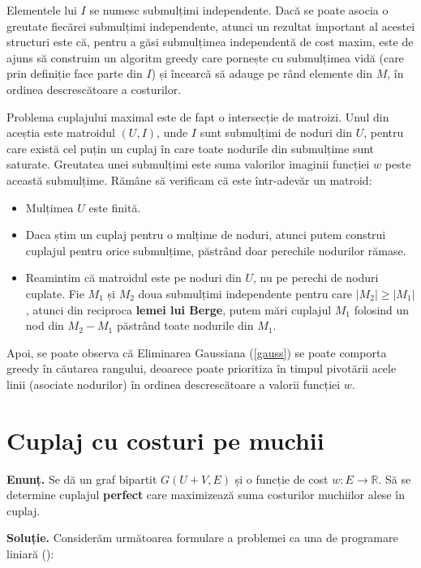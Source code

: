Elementele lui $I$ se numesc submulțimi independente. Dacă se poate asocia o greutate fiecărei submulțimi independente, atunci un rezultat
important al acestei structuri este că, pentru a găsi submulțimea independentă de cost maxim, este de ajuns să construim un algoritm greedy
care pornește cu submulțimea vidă (care prin definiție face parte din $I$) și încearcă să adauge pe rând elemente din $M$, în ordinea descrescătoare
a costurilor.

Problema cuplajului maximal este de fapt o intersecție de matroizi. Unul din aceștia este matroidul $(U, I)$, unde $I$ sunt submulțimi de noduri
din $U$, pentru care există cel puțin un cuplaj în care toate nodurile din submulțime sunt saturate. Greutatea unei submulțimi este suma valorilor
imaginii funcției $w$ peste această submulțime. Rămâne să verificam că este într-adevăr un matroid:

\begin{itemize}
  \item Mulțimea $U$ este finită.
  \item Daca știm un cuplaj pentru o mulțime de noduri, atunci putem construi cuplajul pentru orice submulțime, păstrând doar perechile nodurilor
  rămase.
  \item Reamintim că matroidul este pe noduri din $U$, nu pe perechi de noduri cuplate. Fie $M_{1}$ și $M_{2}$ doua submulțimi independente pentru care
    $|M_{2}| \geq |M_{1}|$, atunci din reciproca \textbf{lemei lui Berge}, putem mări cuplajul $M_{1}$ folosind un nod din $M_{2} - M_{1}$ păstrând
    toate nodurile din $M_{1}$.
\end{itemize}

Apoi, se poate observa că Eliminarea Gaussiana (\ref{gauss}) se poate comporta greedy în căutarea rangului, deoarece poate prioritiza în timpul pivotării
acele linii (asociate nodurilor) în ordinea descrescătoare a valorii funcției $w$.

\pagebreak

\section{Cuplaj cu costuri pe muchii}\label{mincostmatching}

\noindent \textbf{Enunț.} Se dă un graf bipartit $G(U + V, E)$ și o funcție de cost $w \colon E \to \mathbb{R}$. Să se determine cuplajul
\textbf{perfect} care maximizează suma costurilor muchiilor alese în cuplaj.

\noindent \textbf{Soluție.} Considerăm următoarea formulare a problemei ca una de programare liniară (\cite{assignmentlp}):

